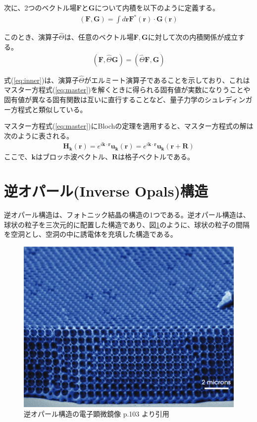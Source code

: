 \documentclass[platex,dvipdfmx,draft]{jsreport}
\numberwithin{equation}{section}
\begin{document}
次に、2つのベクトル場$\bm{F}$と$\bm{G}$について内積を以下のように定義する。
\begin{align}
  (\bm{F}, \bm{G}) = \int d\bm{r} \bm{F}^*(\bm{r}) \cdot \bm{G}(\bm{r})
\end{align}

このとき、演算子$\hat{\Theta}$は、任意のベクトル場$\bm{F}, \bm{G}$に対して次の内積関係が成立する。
\begin{align}
  \label{eq:inner}
  (\bm{F}, \hat{\Theta} \bm{G}) = (\hat{\Theta} \bm{F}, \bm{G})
\end{align}

式(\ref{eq:inner})は、演算子$\hat{\Theta}$がエルミート演算子であることを示しており、これはマスター方程式(\ref{eq:master})を解くときに得られる固有値が実数になりうことや固有値が異なる固有関数は互いに直行することなど、量子力学のシュレディンガー方程式と類似している。

マスター方程式(\ref{eq:master})にBlochの定理を適用すると、マスター方程式の解は次のように表される。
\begin{align}
  \bm{H}_{\bm{k}}(\bm{r}) = e^{i \bm{k} \cdot \bm{r}} \bm{u}_{\bm{k}}(\bm{r}) = e^{i \bm{k} \cdot \bm{r}} \bm{u}_{\bm{k}}(\bm{r + R})
\end{align}
ここで、$\bm{k}$はブロッホ波ベクトル、$\bm{R}$は格子ベクトルである。

\section{逆オパール(Inverse Opals)構造}
逆オパール構造は、フォトニック結晶の構造の1つである。逆オパール構造は、球状の粒子を三次元的に配置した構造であり、図\ref{fig:inverse_opals_image}のように、球状の粒子の間隔を空洞とし、空洞の中に誘電体を充填した構造である。
\begin{figure}[htbp]
  \centering
  \includegraphics[width=0.6\linewidth]{inv_opals.png}
  \caption{逆オパール構造の電子顕微鏡像 \cite{text} p.103 より引用}
  \label{fig:inverse_opals_image}

\end{figure}
\end{document}
